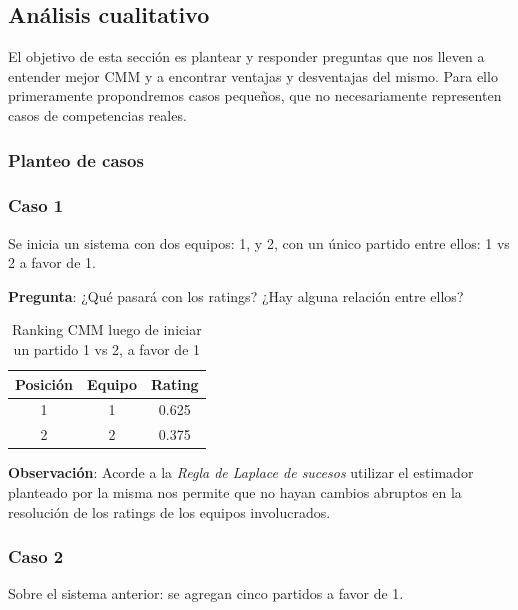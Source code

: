 \subsection{Análisis cualitativo}

El objetivo de esta sección es plantear y responder preguntas que nos lleven a entender mejor CMM y a encontrar ventajas y desventajas del mismo. Para ello primeramente propondremos casos pequeños, que no necesariamente representen casos de competencias reales.

\subsubsection{Planteo de casos}

\subsubsection*{Caso 1}
Se inicia un sistema con dos equipos: 1, y 2, con un único partido entre ellos: 1 vs 2 a favor de 1.

\textbf{Pregunta}: ¿Qué pasará con los ratings? ¿Hay alguna relación entre ellos?

\begin{table}[h!]
    \begin{center}
        \begin{tabular}{|c|c|c|}
        \hline
        \textbf{Posición} & \textbf{Equipo} & \textbf{Rating} \\
        \hline
        1 & 1 & 0.625\\
        2 & 2 & 0.375\\
        \hline
        \end{tabular}
        \caption{Ranking CMM luego de iniciar un partido 1 vs 2, a favor de 1}
        \label{cmm_caso_1}
    \end{center}
\end{table}

\textbf{Observación}: Acorde a la \textit{Regla de Laplace de sucesos} utilizar el estimador planteado por la misma nos permite que no hayan cambios abruptos en la resolución de los ratings de los equipos involucrados.

\subsubsection*{Caso 2}

Sobre el sistema anterior: se agregan cinco partidos a favor de 1.

